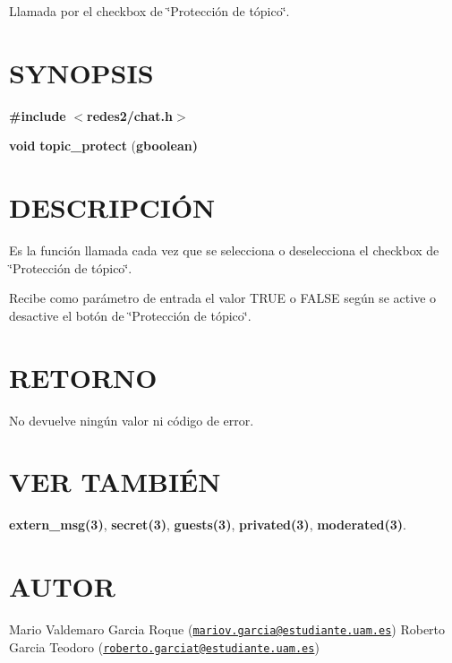 Llamada por el checkbox de \char`\"{}\-Protección de tópico\char`\"{}.\hypertarget{getTamanoFichero_SYNOPSIS}{}\section{S\-Y\-N\-O\-P\-S\-I\-S}\label{getTamanoFichero_SYNOPSIS}
{\bfseries \#include} {\bfseries $<$redes2/chat.\-h$>$} 

{\bfseries void} {\bfseries topic\-\_\-protect} {\bfseries }({\bfseries gboolean{\bfseries })} \hypertarget{getTamanoFichero_descripcion}{}\section{D\-E\-S\-C\-R\-I\-P\-C\-IÓ\-N}\label{getTamanoFichero_descripcion}
Es la función llamada cada vez que se selecciona o deselecciona el checkbox de \char`\"{}\-Protección de tópico\char`\"{}.

Recibe como parámetro de entrada el valor T\-R\-U\-E o F\-A\-L\-S\-E según se active o desactive el botón de \char`\"{}\-Protección de tópico\char`\"{}.\hypertarget{getTamanoFichero_retorno}{}\section{R\-E\-T\-O\-R\-N\-O}\label{getTamanoFichero_retorno}
No devuelve ningún valor ni código de error.\hypertarget{servidorArchivo_seealso}{}\section{V\-E\-R T\-A\-M\-B\-IÉ\-N}\label{servidorArchivo_seealso}
{\bfseries extern\-\_\-msg(3)}, {\bfseries secret(3)}, {\bfseries guests(3)}, {\bfseries privated(3)}, {\bfseries moderated(3)}.\hypertarget{getTamanoFichero_authors}{}\section{A\-U\-T\-O\-R}\label{getTamanoFichero_authors}
Mario Valdemaro Garcia Roque (\href{mailto:mariov.garcia@estudiante.uam.es}{\tt mariov.\-garcia@estudiante.\-uam.\-es}) Roberto Garcia Teodoro (\href{mailto:roberto.garciat@estudiante.uam.es}{\tt roberto.\-garciat@estudiante.\-uam.\-es}) 